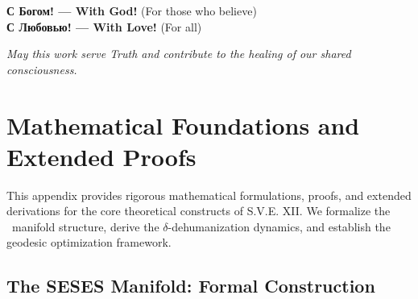 \documentclass[11pt,a4paper]{article}
\theoremstyle{definition}
\theoremstyle{remark}
\begin{document}
\begin{center}
\textbf{С Богом! --- With God!} (For those who believe) \\
\textbf{С Любовью! --- With Love!} (For all)
\end{center}

\vspace{1em}

\textit{May this work serve Truth and contribute to the healing of our shared consciousness.}

\newpage




\newpage


\appendix

\section{Mathematical Foundations and Extended Proofs}
\label{app:math_foundations}

This appendix provides rigorous mathematical formulations, proofs, and extended derivations for the core theoretical constructs of S.V.E. XII. We formalize the \SESES\ manifold structure, derive the $\delta$-dehumanization dynamics, and establish the geodesic optimization framework.

\subsection{The SESES Manifold: Formal Construction}
\label{app:seses_manifold}
\end{document}
